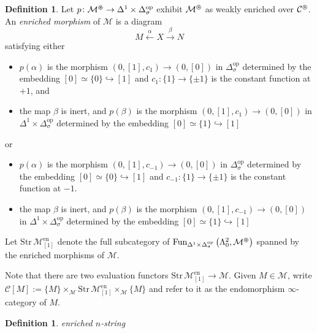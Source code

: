 \documentclass{article}
\DeclareMathOperator{\Fun}{Fun} %
\newcommand{\op}{\mathrm{op}}
\theoremstyle{definition}
\newtheorem{definition}[equation]{Definition}
\begin{document}
\begin{definition}
    Let $ p \colon \mathcal{M}^\varoast  \to \Delta^1\times \Delta^\op_\sigma $ exhibit $ \mathcal{M}^\varoast $ as weakly enriched over $ \mathcal{C}^\varoast $. 
    An \emph{enriched morphism} of $ \mathcal{M} $ is a diagram 
    \begin{equation*}
        M \xleftarrow{\alpha} X \xrightarrow{\beta} N
    \end{equation*}
    satisfying either 
    \begin{itemize}
        \item $ p (\alpha) $ is the morphism $ (0, [1], c_{1}) \to (0,[0]) $ in $ \Delta^\op_\sigma $ determined by the embedding $ [0] \simeq \{0\} \hookrightarrow [1] $ and $ c_1 \colon \{1\} \to \{\pm 1\} $ is the constant function at $ +1 $, and
        \item the map $ \beta $ is inert, and $ p(\beta) $ is the morphism $ (0,[1], c_{1}) \to (0, [0]) $ in $ \Delta^1 \times \Delta^\op_\sigma $ determined by the embedding $ [0]\simeq \{1\} \hookrightarrow [1] $
    \end{itemize}
    or
    \begin{itemize}
        \item $ p (\alpha) $ is the morphism $ (0, [1], c_{-1}) \to (0,[0]) $ in $ \Delta^\op_\sigma $ determined by the embedding $ [0] \simeq \{0\} \hookrightarrow [1] $ and $ c_{-1} \colon \{1\} \to \{\pm 1\} $ is the constant function at $ -1 $. 
        \item the map $ \beta $ is inert, and $ p(\beta) $ is the morphism $ (0,[1], c_{-1}) \to (0, [0]) $ in $ \Delta^1 \times \Delta^\op_\sigma $ determined by the embedding $ [0]\simeq \{1\} \hookrightarrow [1] $
    \end{itemize}
    Let $ \mathrm{Str}\, \mathcal{M}^{\mathrm{en}}_{[1]} $ denote the full subcategory of $ \Fun_{\Delta^1 \times \Delta^\op_\sigma }\left(\Lambda^2_0, \mathcal{M}^{\varoast} \right) $ spanned by the enriched morphisms of $ \mathcal{M} $. 

    Note that there are two evaluation functors $ \mathrm{Str}\, \mathcal{M}^{\mathrm{en}}_{[1]} \to \mathcal{M} $. 
    Given $ M \in \mathcal{M} $, write $ \mathcal{C}[M] := \{M\} \times_{\mathcal{M}} \mathrm{Str}\, \mathcal{M}^{\mathrm{en}}_{[1]} \times_{\mathcal{M}} \{M\} $ and refer to it as the endomorphism $ \infty $-category of $ M $. 
\end{definition} 
\begin{definition}
    \emph{enriched $ n $-string} 
\end{definition}
\end{document}
